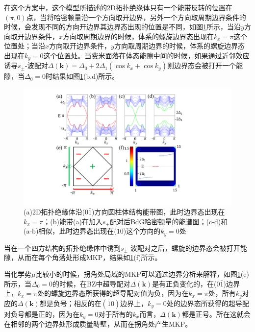  在这个方案中，这个模型所描述的2D拓扑绝缘体只有一个能带反转的位置在$(\pi,0)$点，当将哈密顿量沿一个方向取开边界，另外一个方向取周期边界条件的时候，会发现不同的方向开边界其边界态出现的位置是不同，如图\ref{fig12}所示，当沿$y$方向取开边界条件，$x$方向取周期边界的时候，体系的螺旋边界态出现在$k_x=\pi$这个位置处；当沿$x$方向取开边界条件，$y$方向取周期边界的时候，体系的螺旋边界态出现在$k_y=0$这个位置处。当费米面落在体态能隙中间的时候，如果通过近邻效应诱导$s_\pm$-波配对$\Delta(\mathbf{k})=\Delta_0+2\Delta_1(\cos k_x+\cos k_y)$则边界态会被打开一个能隙，当$\Delta_0=0$时结果如图\ref{fig12}(b,d)所示。
\begin{figure}[h]
\centering
\includegraphics[scale=0.7]{pic/fig13}
\caption{(a)2D拓扑绝缘体沿($0\bar{1}$)方向圆柱体结构能带图，此时边界态出现在$k_x=\pi$；(b)能带(a)在加入$s_\pm$配对后BdG哈密顿量的能谱图；(c-d)和(a-b)相似，此时边界态出现在($\bar{1}0$)这个方向的$k_y=0$处}\label{fig12}
\end{figure}
当在一个四方结构的拓扑绝缘体中诱到$s_\pm$-波配对之后，螺旋的边界态会被打开能隙，从而在每个角落处形成MKP，结果如\ref{fig12}(f)所示。

 当化学势$\mu$比较小的时候，拐角处局域的MKP可以通过边界分析来解释，如图\ref{fig12}(e)所示，当$\Delta_0=0$的时候，在BZ中超导配对$\Delta(\mathbf{k})$是有正负变化的，在($0\bar{1}$)边界上，$k_x=\pi$处的螺旋边界态所获得的超导配对值为负，因为在$k_x=\pi$处，所有$k_y$对应的$\Delta(\mathbf{k})$都是负号；相反的在$(\bar{1}0)$边界上，$k_y=0$处的边界态所获得的超导配对负号都是正的，因为在$k_y=0$对于所有的$k_x$而言，$\Delta(\mathbf{k})$都是正号。所在这就会在相邻的两个边界处形成质量畴壁，从而在拐角处产生MKP。


